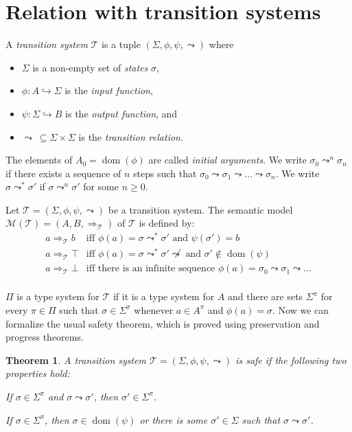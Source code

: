 \documentclass[a4paper,final,preprint,sort&compress]{elsarticle}
\newtheorem{theorem}[definition]{Theorem}
\newcommand{\M}{\ensuremath{\mathcal{M}}}
\newcommand{\T}{\ensuremath{\mathcal{T}}}
\DeclareMathOperator{\dom}{dom}
\DeclareMathOperator{\pto}{\hookrightarrow}
\begin{document}
\section{Relation with transition systems}
\label{sec:Relation_with_transition_systems}


A \emph{transition system} $\T$ is a tuple $(\Sigma, \phi, \psi, \leadsto)$ where
\begin{itemize}
\item $\Sigma$ is a non-empty set of \emph{states} $\sigma$,
\item $\phi: A \pto \Sigma$ is the \emph{input function},
\item $\psi: \Sigma \pto B$ is the \emph{output function}, and
\item $\leadsto~\subseteq \Sigma \times \Sigma$ is the \emph{transition relation}.
\end{itemize}
The elements of $A_0 = \dom(\phi)$ are called \emph{initial arguments}.
We write \mbox{$\sigma_0 \leadsto^n \sigma_n$} if there exists a sequence of $n$ steps
such that \mbox{$\sigma_0 \leadsto \sigma_1 \leadsto \ldots \leadsto \sigma_n$}. We
write \mbox{$\sigma \leadsto^* \sigma'$} if \mbox{$\sigma \leadsto^n \sigma'$} for some
\mbox{$n \ge 0$}.

Let $\T = (\Sigma,\phi,\psi,\leadsto)$ be a transition system. The semantic model
\mbox{$\M(\T) = (A,B,\Rightarrow_\T)$} of $\T$ is defined by:
\[\begin{array}{ll}
  a \Rightarrow_\T b
  & \mbox{iff $\phi(a) = \sigma \leadsto^* \sigma'$ and $\psi(\sigma') = b$} \\
  a \Rightarrow_\T \top
  & \mbox{iff $\phi(a) = \sigma \leadsto^* \sigma' \not\leadsto$ and $\sigma' \not\in\dom(\psi)$} \\
  a \Rightarrow_\T \bot
  & \mbox{iff there is an infinite sequence $\phi(a) = \sigma_0 \leadsto \sigma_1 \leadsto \ldots$} \\
\end{array}\]

$\Pi$ is a type system for $\T$ if it is a type system for $A$ and there are sets $\Sigma^\pi$ for
every $\pi \in \Pi$ such that $\sigma \in \Sigma^\pi$ whenever $a \in A^\pi$ and $\phi(a) = \sigma$.
Now we can formalize the usual safety theorem, which is proved using preservation and progress
theorems.

\begin{theorem}
  A transition system $\T = (\Sigma,\phi,\psi,\leadsto)$ is safe if the following two properties hold:
  \begin{description}[labelindent=\parindent,style=nextline]
  \item[Preservation] 

    If $\sigma \in \Sigma^\pi$ and $\sigma \leadsto \sigma'$, then $\sigma' \in \Sigma^\pi$.

  \item[Progress] 

    If \mbox{$\sigma \in \Sigma^\pi$}, then \mbox{$\sigma \in \dom(\psi)$} or there is some
    \mbox{$\sigma' \in \Sigma$} such that \mbox{$\sigma \leadsto \sigma'$}.
    
  \end{description}
\end{theorem}
\end{document}
